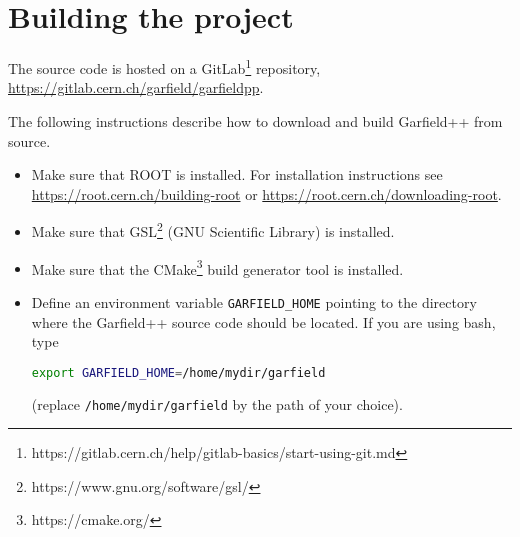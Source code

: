 
\section{Building the project}

The source code is hosted on a GitLab\footnote{https://gitlab.cern.ch/help/gitlab-basics/start-using-git.md} repository,
\url{https://gitlab.cern.ch/garfield/garfieldpp}.

The following instructions describe how to download 
and build Garfield++ from source. 
\begin{itemize}
  \item
  Make sure that ROOT is installed. For installation instructions 
  see \url{https://root.cern.ch/building-root} or
  \url{https://root.cern.ch/downloading-root}.
  \item
  Make sure that GSL\footnote{https://www.gnu.org/software/gsl/}
  (GNU Scientific Library) is installed.
  \item
  Make sure that the CMake\footnote{https://cmake.org/} 
  build generator tool is installed.
  \item
  Define an environment variable \texttt{GARFIELD\_HOME} 
  pointing to the directory where the Garfield++ source code
  should be located.
  If you are using bash, type
\begin{lstlisting}[language=bash]
export GARFIELD_HOME=/home/mydir/garfield
\end{lstlisting} 
  (replace \texttt{/home/mydir/garfield} by the path of your choice).
  

\end{itemize}
